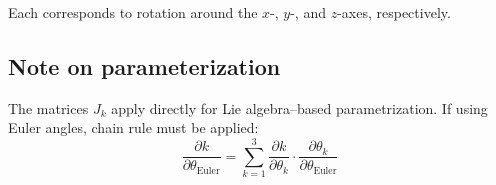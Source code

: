 \documentclass{article}
\begin{document}
Each corresponds to rotation around the \( x \)-, \( y \)-, and \( z \)-axes, respectively.

\subsection*{Note on parameterization}

The matrices \( J_k \) apply directly for Lie algebra–based parametrization. If using Euler angles, chain rule must be applied:
\[
\frac{\partial k}{\partial \theta_{\text{Euler}}} = \sum_{k=1}^3 \frac{\partial k}{\partial \theta_k} \cdot \frac{\partial \theta_k}{\partial \theta_{\text{Euler}}}
\]
\end{document}
